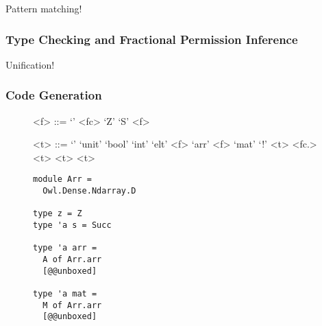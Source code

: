 Pattern matching!

\subsubsection{Type Checking and Fractional Permission Inference}

Unification!

\subsubsection{Code Generation}

\begin{figure}[tp]
    \centering
    \begin{minipage}{.3\textwidth}
        \centering
        \begin{grammar}
            <f> ::= `'
            \alt <fc>
            \alt `Z'
            \alt `S' <f>

            <t> ::= `'
            \alt `unit'
            \alt `bool'
            \alt `int'
            \alt `elt'
            \alt <f> `arr'
            \alt <f> `mat'
            \alt `!' <t>
            \alt \synt{$\forall$} <fc.> <t>
            \alt <t> \lit{$\otimes$} 
            \alt <t> \lit{$\multimap$} 
        \end{grammar}
    \end{minipage}
    \begin{minipage}{.3\textwidth}
        \centering
        \begin{verbatim}
module Arr =
  Owl.Dense.Ndarray.D

type z = Z
type 'a s = Succ

type 'a arr =
  A of Arr.arr
  [@@unboxed]

type 'a mat =
  M of Arr.arr
  [@@unboxed]


\end{verbatim}
\end{minipage}
\end{figure}
